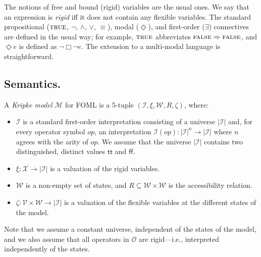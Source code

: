 \documentclass[a4paper,fleqn,envcountsame,orivec]{llncs}
\newcommand{\implies}{\Rightarrow}
\newcommand{\true}{\textsf{tt}}
\newcommand{\false}{\textsf{ff}}
\newcommand{\II}{\mathcal{I}}
\newcommand{\MM}{\mathcal{M}}
\newcommand{\OO}{\mathcal{O}}
\newcommand{\VV}{\mathcal{V}}
\newcommand{\WW}{\mathcal{W}}
\newcommand{\XX}{\mathcal{X}}
\newcommand{\edmargin}[2]{\marginpar{\raggedright\footnotesize\color{red}#1: #2}}
\newcommand{\edmargin}[2]{}
\def\llmargin{\edmargin{LL}}
\def\smmargin{\edmargin{SM}}
\begin{document}
The notions of free and bound (rigid) variables are the usual ones. We say that
an expression is \emph{rigid} iff it does not contain any flexible variables. The
standard propositional ($\mbox{\sc true}$, $\lnot$, $\land$, $\lor$, $\equiv$), modal
($\Diamond$), and first-order ($\exists$) connectives are defined in the usual
way; for example, $\mbox{\sc true}$ abbreviates $\FALSE \implies \FALSE$, and $\Diamond e$
is defined as $\lnot\Box\lnot e$.
The extension to a multi-modal language is straightforward.

\subsection{Semantics.}

A \emph{Kripke model} $\MM$ for FOML
is a 5-tuple $(\II, \xi, \WW, R, \zeta)$,
where:
\begin{itemize}
\item $\II$ is a standard first-order interpretation consisting of a universe
  $|\II|$ and, for every operator symbol $op$, an interpretation
%
  \(
    \II(op): |\II|^n \rightarrow |\II|
  \)
%
  where $n$ agrees with the arity of $op$. We assume that the universe $|\II|$
  contains two distinguished, distinct values $\true$ and $\false$.
\item $\xi: \XX \rightarrow |\II|$ is a valuation of the rigid variables.
\item $\WW$ is a non-empty set of states, and
  $R \subseteq \WW \times \WW$ is the accessibility relation.
\item $\zeta: \VV \times \WW \rightarrow |\II|$ is a valuation of the flexible
  variables at the different states of the model.
\end{itemize}
%
Note that we assume a constant universe, independent of the states of
the model, and we also assume that all operators
in $\OO$
are rigid---i.e., interpreted independently of
the states.
\end{document}
